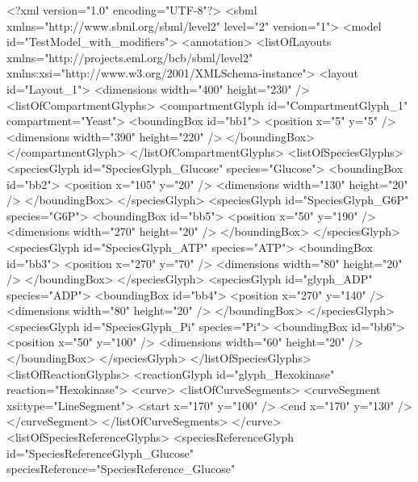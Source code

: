 \begin{example}
<?xml version="1.0" encoding="UTF-8"?>
<sbml xmlns="http://www.sbml.org/sbml/level2" level="2" version="1">
  <model id="TestModel_with_modifiers">
    <annotation>
     <listOfLayouts xmlns="http://projects.eml.org/bcb/sbml/level2"
              xmlns:xsi="http://www.w3.org/2001/XMLSchema-instance">
      <layout id="Layout_1">
        <dimensions width="400" height="230" />
        <listOfCompartmentGlyphs>
          <compartmentGlyph id="CompartmentGlyph_1" compartment="Yeast">
            <boundingBox id="bb1">
              <position x="5" y="5" />
              <dimensions width="390" height="220" />
            </boundingBox>
          </compartmentGlyph>
        </listOfCompartmentGlyphs>
        <listOfSpeciesGlyphs>
          <speciesGlyph id="SpeciesGlyph_Glucose" species="Glucose">
            <boundingBox id="bb2">
              <position x="105" y="20" />
              <dimensions width="130" height="20" />
            </boundingBox>
          </speciesGlyph>
          <speciesGlyph id="SpeciesGlyph_G6P" species="G6P">
            <boundingBox id="bb5">
              <position x="50" y="190" />
              <dimensions width="270" height="20" />
            </boundingBox>
          </speciesGlyph>
          <speciesGlyph id="SpeciesGlyph_ATP" species="ATP">
            <boundingBox id="bb3">
              <position x="270" y="70" />
              <dimensions width="80" height="20" />
            </boundingBox>
          </speciesGlyph>
          <speciesGlyph id="glyph_ADP" species="ADP">
            <boundingBox id="bb4">
              <position x="270" y="140" />
              <dimensions width="80" height="20" />
            </boundingBox>
          </speciesGlyph>
          <speciesGlyph id="SpeciesGlyph_Pi" species="Pi">
            <boundingBox id="bb6">
              <position x="50" y="100" />
              <dimensions width="60" height="20" />
            </boundingBox>
          </speciesGlyph>
        </listOfSpeciesGlyphs>
        <listOfReactionGlyphs>
          <reactionGlyph id="glyph_Hexokinase" reaction="Hexokinase">
            <curve>
              <listOfCurveSegments>
                <curveSegment xsi:type="LineSegment">
                  <start x="170" y="100" />
                  <end x="170" y="130" />
                </curveSegment>
              </listOfCurveSegments>
            </curve>
            <listOfSpeciesReferenceGlyphs>
              <speciesReferenceGlyph id="SpeciesReferenceGlyph_Glucose"
                            speciesReference="SpeciesReference_Glucose"

\end{example}
